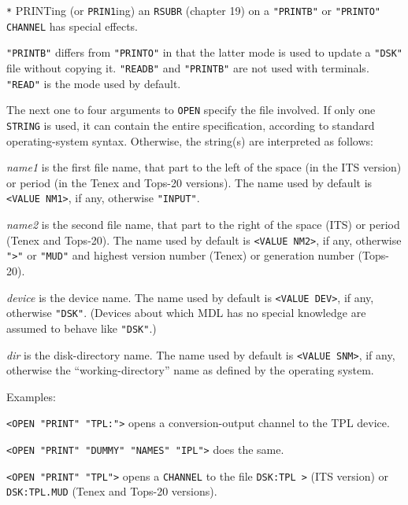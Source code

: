 \documentclass[a4paper]{scrbook}
\begin{document}
\texttt{*} PRINTing (or \texttt{PRIN1}ing) an \texttt{RSUBR} (chapter 19) on a \texttt{"PRINTB"} or \texttt{"PRINTO"}
\texttt{CHANNEL} has special effects.

\texttt{"PRINTB"} differs from \texttt{"PRINTO"} in that the latter mode is used to update a \texttt{"DSK"}
 file without copying it. \texttt{"READB"} and \texttt{"PRINTB"} are not used with
terminals. \texttt{"READ"} is the mode used by default.

The next one to four arguments to \texttt{OPEN} specify the file involved. If only one \texttt{STRING} is used, it can
contain the entire specification, according to standard operating-system syntax. Otherwise, the string(s) are interpreted
as follows:

\emph{name1} is the first file name, that part to the left of the space (in the ITS  version) or period
(in the Tenex  and Tops-20  versions). The name used by default is
\texttt{\textless{}VALUE\ NM1\textgreater{}}, if any, otherwise \texttt{"INPUT"}.

\emph{name2} is the second file name, that part to the right of the space (ITS) or period (Tenex and Tops-20). The name
used by default is \texttt{\textless{}VALUE\ NM2\textgreater{}}, if any, otherwise
\texttt{"\textgreater{}"}  or \texttt{"MUD"}  and highest
version number (Tenex) or generation number (Tops-20).

\emph{device} is the device name. The name used by default is
\texttt{\textless{}VALUE\ DEV\textgreater{}}, if any, otherwise \texttt{"DSK"}. (Devices about
which MDL has no special knowledge are assumed to behave like \texttt{"DSK"}.)

\emph{dir} is the disk-directory name. The name used by default is
\texttt{\textless{}VALUE\ SNM\textgreater{}}, if any, otherwise the ``working-directory'' name
as defined by the operating system.

Examples:

\texttt{\textless{}OPEN\ "PRINT"\ "TPL:"\textgreater{}} opens a conversion-output channel to the TPL device.

\texttt{\textless{}OPEN\ "PRINT"\ "DUMMY"\ "NAMES"\ "IPL"\textgreater{}} does the same.

\texttt{\textless{}OPEN\ "PRINT"\ "TPL"\textgreater{}} opens a \texttt{CHANNEL} to the file
\texttt{DSK:TPL\ \textgreater{}} (ITS version) or \texttt{DSK:TPL.MUD} (Tenex and Tops-20 versions).
\end{document}
